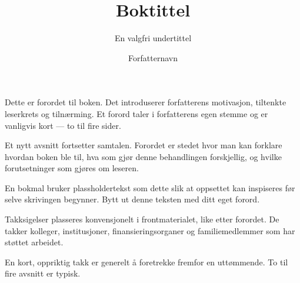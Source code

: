 \documentclass[11pt,twoside,b5paper]{book}
\begin{document}
\frontmatter
{}
\pagestyle{frontmatterstyle}


\title{Boktittel}
\subtitle{En valgfri undertittel}
\author{Forfatternavn}
\date{\the\year}


\booktitlepage





\booktoc
\cleardoublepage


Dette er forordet til boken. Det introduserer forfatterens motivasjon, tiltenkte leserkrets og tilnærming. Et forord taler i forfatterens egen stemme og er vanligvis kort --- to til fire sider.

Et nytt avsnitt fortsetter samtalen. Forordet er stedet hvor man kan forklare hvordan boken ble til, hva som gjør denne behandlingen forskjellig, og hvilke forutsetninger som gjøres om leseren.

En bokmal bruker plassholdertekst som dette slik at oppsettet kan inspiseres før selve skrivingen begynner. Bytt ut denne teksten med ditt eget forord.

\cleardoublepage


Takksigelser plasseres konvensjonelt i frontmaterialet, like etter forordet. De takker kolleger, institusjoner, finansieringsorganer og familiemedlemmer som har støttet arbeidet.

En kort, oppriktig takk er generelt å foretrekke fremfor en uttømmende. To til fire avsnitt er typisk.

\cleardoublepage


\mainmatter
\pagestyle{chapterstyle}
\end{document}
